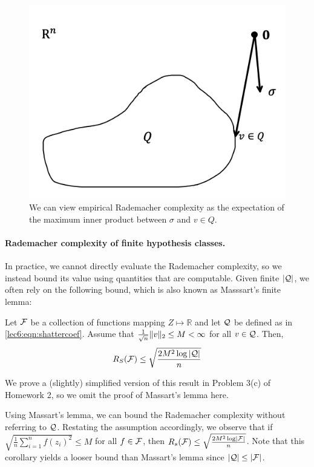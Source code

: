 \begin{figure}[ht!]
	\begin{center}
		\includegraphics[width=.5\textwidth]{figures/remark2.png}
	\end{center}
	\caption{We can view empirical Rademacher complexity as the expectation of the maximum inner product between $\sigma$ and $v\in Q$.}
	\label{lec6:fig:rs-innerprod}
\end{figure}

\paragraph{Rademacher complexity of finite hypothesis classes.} In practice, we cannot directly evaluate the Rademacher complexity, so we instead bound its value using quantities that are computable. Given finite $|\mathcal Q|$, we often rely on the following bound, which is also known as Masssart's finite lemma: 
\begin{proposition}
    Let $\mathcal F$ be a collection of functions mapping $Z \mapsto \mathbb{R}$ and let $\mathcal Q$ be defined as in \eqref{lec6:eqn:shattercoef}. Assume that $\frac{1}{\sqrt{n}} \|v\|_2 \le M < \infty$ for all $v \in \mathcal Q$. Then,
    \begin{align}
        R_S(\mathcal F) \leq \sqrt{\frac{2 M^2 \log |\mathcal Q|}{n}}
    \end{align}
    \label{lec6:prop:massartlemma}
\end{proposition}
We prove a (slightly) simplified version of this result in Problem 3(c) of Homework 2, so we omit the proof of Massart's lemma here. 

\begin{remark}
    Using Massart's lemma, we can bound the Rademacher complexity without referring to $\mathcal Q$. Restating the assumption accordingly, we observe that if $\sqrt{\frac{1}{n}\sum_{i=1}^n f(z_i)^2} \le M$ for all $f \in \mathcal F$, then $R_s(\mathcal F) \le \sqrt{\frac{2M^2\log \left\lvert\mathcal F\right\rvert}{n}}$.  Note that this corollary yields a looser bound than Massart's lemma since $|\mathcal Q| \leq |\mathcal F|$. 
\end{remark}
    
